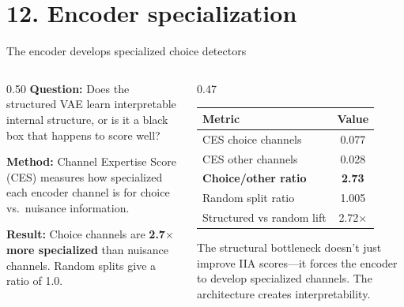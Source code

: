 \documentclass[aspectratio=169,11pt]{beamer}
\begin{document}
\section{12. Encoder specialization}\hypertarget{sec:12}{}

\begin{frame}{The encoder develops specialized choice detectors}
\begin{columns}[T]
\begin{column}{0.50\textwidth}
\textbf{Question:} Does the structured VAE learn interpretable internal structure, or is it a black box that happens to score well?

\vspace{0.5em}
\textbf{Method:} Channel Expertise Score (CES) measures how specialized each encoder channel is for choice vs.\ nuisance information.

\vspace{0.5em}
\textbf{Result:} Choice channels are \textbf{2.7$\times$ more specialized} than nuisance channels. Random splits give a ratio of 1.0.
\end{column}

\begin{column}{0.47\textwidth}
\vspace{0.5em}
{\small
\begin{tabular}{lc}
\toprule
\textbf{Metric} & \textbf{Value} \\
\midrule
CES choice channels & 0.077 \\
CES other channels & 0.028 \\
\textbf{Choice/other ratio} & \textbf{2.73} \\
Random split ratio & 1.005 \\
Structured vs random lift & 2.72$\times$ \\
\bottomrule
\end{tabular}
}

\vspace{0.5em}
{\small The structural bottleneck doesn't just improve IIA scores---it forces the encoder to develop specialized channels. The architecture creates interpretability.}
\end{column}
\end{columns}
\end{frame}
\end{document}
